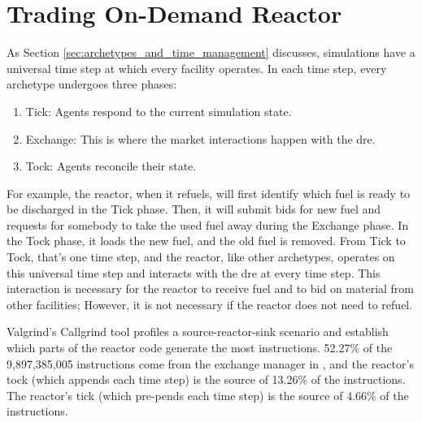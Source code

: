 
\section{Trading On-Demand Reactor}
\label{sec:trading_reactor}

As Section \ref{sec:archetypes_and_time_management} discusses, \cyclus simulations have a universal time step at which every facility operates. In each \cyclus time step, every archetype undergoes three phases:
\begin{enumerate}
    \item Tick: Agents respond to the current simulation state.
    \item Exchange: This is where the market interactions happen with the \gls{dre}.
    \item Tock: Agents reconcile their state.
\end{enumerate}

For example, the \cycamore reactor, when it refuels, will first identify which fuel is ready to be discharged in the Tick phase. Then, it will submit bids for new fuel and requests for somebody to take the used fuel away during the Exchange phase. In the Tock phase, it loads the new fuel, and the old fuel is removed. From Tick to Tock, that's one time step, and the \cycamore reactor, like other archetypes, operates on this universal time step and interacts with the \gls{dre} at every time step. This interaction is necessary for the reactor to receive fuel and to bid on material from other facilities; However, it is not necessary if the reactor does not need to refuel.

Valgrind's \cite{valgrind} Callgrind \cite{callgrind} tool profiles a source-reactor-sink scenario and establish which parts of the \cycamore reactor code generate the most instructions. 52.27\% of the 9,897,385,005 instructions come from the exchange manager in \cyclus, and the reactor's tock (which appends each time step) is the source of 13.26\% of the instructions. The reactor's tick (which pre-pends each time step) is the source of 4.66\% of the instructions.

